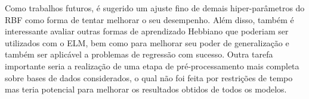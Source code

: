 \documentclass[conference]{IEEEtran}
\begin{document}
	Como trabalhos futuros, é sugerido um ajuste fino de demais hiper-parâmetros do RBF como forma de tentar melhorar o seu desempenho. Além disso, também é interessante avaliar outras formas de aprendizado Hebbiano que poderiam ser utilizados com o ELM, bem como para melhorar seu poder de generalização e também ser aplicável a problemas de regressão com sucesso. Outra tarefa importante seria a realização de uma etapa de pré-processamento mais completa sobre bases de dados considerados, o qual não foi feita por restrições de tempo mas teria potencial para melhorar os resultados obtidos de todos os modelos.
		


    
	
	
\end{document}
